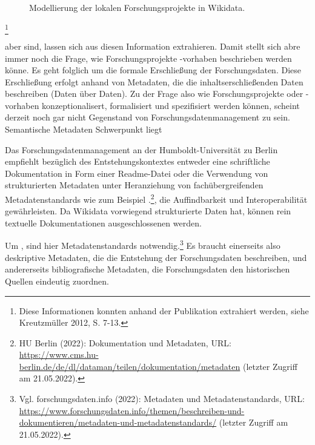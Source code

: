  


\begin{figure}[h]
    \centering
    \caption{Modellierung der lokalen Forschungsprojekte in Wikidata.\protect\footnotemark}
    \label{fig:x cubed graph}
\end{figure}








 

\footnote{Diese Informationen konnten anhand der Publikation extrahiert werden, siehe Kreutzmüller 2012, S. 7-13.}



aber sind, lassen sich aus diesen Information extrahieren. Damit stellt sich abre immer noch die Frage, wie Forschungsprojekte -vorhaben beschrieben werden könne.
Es geht folglich um die formale Erschließung der Forschungsdaten. Diese Erschließung erfolgt anhand von Metadaten, die die inhaltserschließenden Daten beschreiben (Daten über Daten). 
Zu der Frage also wie Forschungsprojekte oder -vorhaben konzeptionalisert, formalisiert und spezifisiert werden können, scheint derzeit noch gar nicht Gegenstand von Forschungsdatenmanagement zu sein. Semantische Metadaten Schwerpunkt liegt


Das Forschungsdatenmanagement an der Humboldt-Universität zu Berlin empfiehlt bezüglich des Entstehungskontextes entweder eine schriftliche Dokumentation in Form einer Readme-Datei oder die Verwendung von strukturierten Metadaten unter Heranziehung von fachübergreifenden Metadatenstandards wie zum Beispiel .\footnote{HU Berlin (2022): Dokumentation und Metadaten, URL: \url{https://www.cms.hu-berlin.de/de/dl/dataman/teilen/dokumentation/metadaten} (letzter Zugriff am 21.05.2022).}, die Auffindbarkeit und Interoperabilität gewährleisten. Da Wikidata vorwiegend strukturierte Daten hat, können rein textuelle Dokumentationen ausgeschlossenen werden. 





Um , sind hier Metadatenstandards notwendig.\footnote{Vgl. forschungsdaten.info (2022): Metadaten und Metadatenstandards, URL: \url{https://www.forschungsdaten.info/themen/beschreiben-und-dokumentieren/metadaten-und-metadatenstandards/} (letzter Zugriff am 21.05.2022).} 
Es braucht einerseits also deskriptive Metadaten, die die Entstehung der Forschungsdaten beschreiben, und andererseits bibliografische Metadaten, die Forschungsdaten den historischen Quellen eindeutig zuordnen.







